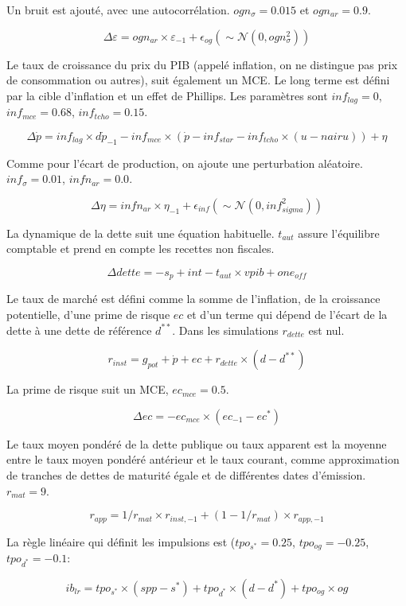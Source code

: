 \documentclass[
  french,
  9pt,
  a4paper,
  DIV=11,
  twoside=semi]{scrreprt}
\begin{document}
Un bruit est ajouté, avec une autocorrélation. \(ogn_\sigma=0.015\) et
\(ogn_{ar}=0.9\).

\[
\Delta \varepsilon = ogn_{ar} \times \varepsilon_{-1} + \epsilon_{og} (\sim \mathcal{N}(0,ogn_{\sigma}^2))
\]

Le taux de croissance du prix du PIB (appelé inflation, on ne distingue
pas prix de consommation ou autres), suit également un MCE. Le long
terme est défini par la cible d'inflation et un effet de Phillips. Les
paramètres sont \(inf_{lag}=0\), \(inf_{mce}=0.68\),
\(inf_{tcho}=0.15\).

\[
\Delta\dot{p} = inf_{lag} \times d\dot p_{-1} - inf_{mce} \times (\dot p - inf_{star} - inf_{tcho} \times (u - nairu)) +\eta
\]

Comme pour l'écart de production, on ajoute une perturbation aléatoire.
\(inf_{\sigma}=0.01\), \(infn_{ar}=0.0\).

\[
\Delta \eta = infn_{ar} \times \eta_{-1} + \epsilon_{inf} (\sim \mathcal{N}(0,inf_{sigma}^2))
\]

La dynamique de la dette suit une équation habituelle. \(t_{aut}\)
assure l'équilibre comptable et prend en compte les recettes non
fiscales.

\[
\Delta dette = -s_p + int - t_{aut} \times vpib + one_{off}
\]

Le taux de marché est défini comme la somme de l'inflation, de la
croissance potentielle, d'une prime de risque \(ec\) et d'un terme qui
dépend de l'écart de la dette à une dette de référence \(d^{**}\). Dans
les simulations \(r_{dette}\) est nul.

\[
r_{inst} = g_{pot} + \dot{p} + ec + r_{dette} \times (d - d^{**})
\]

La prime de risque suit un MCE, \(ec_{mce}=0.5\).

\[
\Delta ec = -ec_{mce} \times (ec_{-1} - ec^*)
\]

Le taux moyen pondéré de la dette publique ou taux apparent est la
moyenne entre le taux moyen pondéré antérieur et le taux courant, comme
approximation de tranches de dettes de maturité égale et de différentes
dates d'émission. \(r_{mat}=9\).

\[
r_{app} = 1/r_{mat} \times r_{inst, -1} + (1-1/r_{mat}) \times r_{app, -1}
\]

La règle linéaire qui définit les impulsions est (\(tpo_{s^*}=0.25\),
\(tpo_{og}=-0.25\), \(tpo_{d^*}=-0.1\):

\[
ib_{lr} = tpo_{s^*} \times (spp - s^*) + tpo_{d^*} \times (d- d^*) + tpo_{og}\times og
\]
\end{document}
